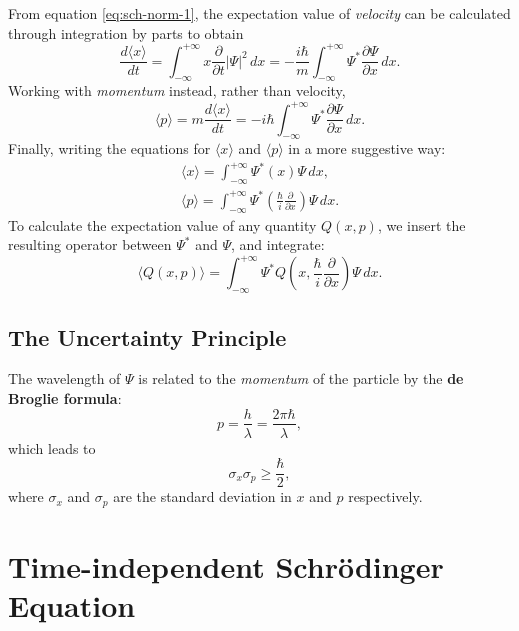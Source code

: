 \documentclass{article}
\begin{document}
From equation \eqref{eq:sch-norm-1}, the expectation value of \emph{velocity}
can be calculated through integration by parts to obtain \[
  \frac{d\langle x \rangle}{dt}
  = \int_{-\infty}^{+\infty} x \frac{\partial}{\partial t} |\Psi|^2 \,dx
  = -\frac{i\hbar}{m} \int_{-\infty}^{+\infty} \Psi^*
  \frac{\partial \Psi}{\partial x} \,dx.
\] Working with \emph{momentum} instead, rather than velocity, \[
  \langle p \rangle
  = m \frac{d \langle x \rangle}{dt}
  = -i\hbar \int_{-\infty}^{+\infty}
    \Psi^*\frac{\partial \Psi}{\partial x}
  \,dx.
\]
Finally, writing the equations for $\langle x \rangle$ and $\langle p \rangle$
in a more suggestive way:
\begin{gather}
  \label{eq:sch-vel}
  \langle x \rangle = \int_{-\infty}^{+\infty} \Psi^* (x) \Psi \,dx, \\
  \label{eq:sch-mom}
  \langle p \rangle
  = \int_{-\infty}^{+\infty} \Psi^*\left(
    \frac{\hbar}{i} \frac{\partial}{\partial x}
  \right)\Psi \,dx.
\end{gather}
To calculate the expectation value of any quantity $Q(x, p)$, we insert the
resulting operator between $\Psi^*$ and $\Psi$, and integrate:
\begin{equation} \label{eq:sch-qty}
  \boxed{
    \langle Q(x, p) \rangle = \int_{-\infty}^{+\infty} \Psi^* Q\left(
      x, \frac{\hbar}{i}\frac{\partial}{\partial x}
    \right)\Psi \,dx.
  }
\end{equation}

\subsection{The Uncertainty Principle}

The wavelength of $\Psi$ is related to the \emph{momentum} of the particle by
the \textbf{de Broglie formula}:
\begin{equation} \label{eq:de-brog}
  p = \frac{h}{\lambda} = \frac{2\pi\hbar}{\lambda},
\end{equation}
which leads to
\begin{equation} \label{eq:unc-prin}
  \boxed{
    \sigma_x \sigma_p \geq \frac{\hbar}{2},
  }
\end{equation}
where $\sigma_x$ and $\sigma_p$ are the standard deviation in $x$ and $p$
respectively.

\section{Time-independent Schr\"{o}dinger Equation}
\end{document}
